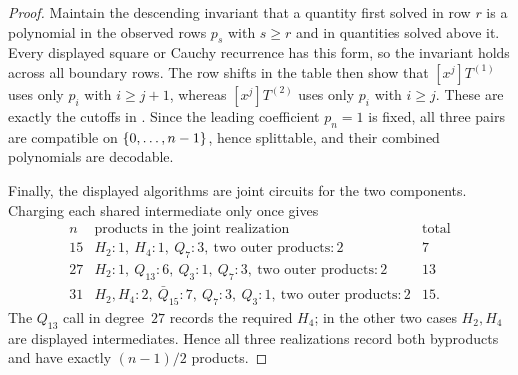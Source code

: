 \begin{proof}
    Maintain the descending invariant that a quantity first solved in row
    $r$ is a polynomial in the observed rows $p_s$ with $s\ge r$ and in
    quantities solved above it.  Every displayed square or Cauchy recurrence
    has this form, so the invariant holds across all boundary rows.  The row
    shifts in the table then show that $[x^j]T^{(1)}$ uses only $p_i$ with
    $i\ge j+1$, whereas $[x^j]T^{(2)}$ uses only $p_i$ with $i\ge j$.
    These are exactly the cutoffs in .  Since the
    leading coefficient $p_n=1$ is fixed, all three pairs are compatible on
    $\{0,\dotsc,n-1\}$, hence splittable, and their combined polynomials are decodable.

    Finally, the displayed algorithms are joint circuits for the two
    components.  Charging each shared intermediate only once gives
    \[
    \begin{array}{c|c|c}
      n&\text{products in the joint realization}&\text{total}\\ \hline
      15&H_2:1,\ H_4:1,\ Q_7:3,\ \text{two outer products}:2&7\\
      27&H_2:1,\ Q_{13}:6,\ Q_3:1,\ Q_7:3,\ \text{two outer products}:2&13\\
      31&H_2,H_4:2,\ \bar Q_{15}:7,\ Q_7:3,\ Q_3:1,\
          \text{two outer products}:2&15.
    \end{array}
    \]
    The $Q_{13}$ call in degree~$27$ records the required $H_4$; in the
    other two cases $H_2,H_4$ are displayed intermediates.  Hence all three
    realizations record both byproducts and have exactly $(n-1)/2$ products.
\end{proof}
